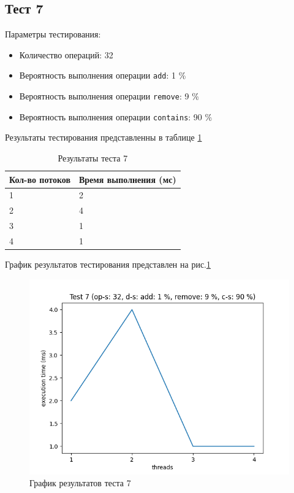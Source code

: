 \subsection*{Тест 7}

Параметры тестирования:

\begin{itemize}
    \item Количество операций: 32
    \item Вероятность выполнения операции \verb|add|: 1 \%
    \item Вероятность выполнения операции \verb|remove|: 9 \%
    \item Вероятность выполнения операции \verb|contains|: 90 \%
\end{itemize}

Результаты тестирования представленны в таблице \ref{tab:results7}


\begin{table}[H]
    \centering
    \begin{tabular}{|l|l|}
        \hline
        Кол-во потоков & Время выполнения (мс) \\
        \hline
        1 & 2 \\
        \hline
        2 & 4 \\
        \hline
        3 & 1 \\
        \hline
        4 & 1 \\
        \hline
    \end{tabular}
    \caption{Результаты теста 7}
    \label{tab:results7}
\end{table}
        

График результатов тестирования представлен на рис.\ref{fig:plot7}

\begin{figure}[H]
    \centering
    \includegraphics[width=0.7\linewidth]{photo/plot7}
    \caption{График результатов теста 7}
    \label{fig:plot7}
\end{figure}

